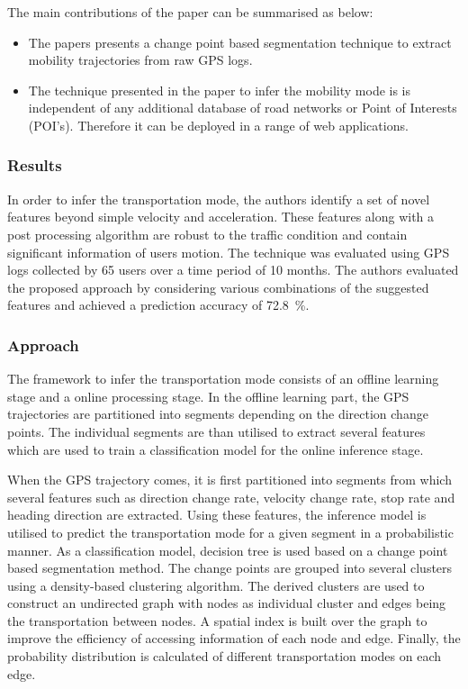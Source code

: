 The main contributions of the paper can be summarised as below:

\begin{itemize}
	\item The papers presents a change point based segmentation technique to extract mobility 
	trajectories from raw GPS logs. 
	
	\item The technique presented in the paper to infer the mobility mode is is independent 
	of any additional database of road networks or Point of Interests (POI's). Therefore it can 
	be deployed in a range of web applications. 
\end{itemize}

\subsubsection*{Results}

In order to infer the transportation mode, the authors identify a set of novel features beyond
simple velocity and acceleration. These features along with a post processing algorithm are
robust to the traffic condition and contain significant information of users motion. The technique
was evaluated using GPS logs collected by 65 users over a time period of 10 months. The authors
evaluated the proposed approach by considering various combinations of the suggested features
and achieved a prediction accuracy of 72.8~\%.

\subsubsection*{Approach}

The framework to infer the transportation mode consists of an offline learning stage and a online
processing stage. In the offline learning part, the GPS trajectories are partitioned into segments
depending on the direction change points. The individual segments are than utilised to extract
several features which are used to train a classification model for the online inference stage.\newline

When the GPS trajectory comes, it is first partitioned into segments from which several features such as
direction change rate, velocity change rate, stop rate and heading direction are extracted.
Using these features, the inference model is utilised to predict the transportation mode for
a given segment in a probabilistic manner. As a classification model, decision tree is used based on
a change point based segmentation method. The change points are grouped into several clusters using
a density-based clustering algorithm. The derived clusters are used to construct an undirected graph
with nodes as individual cluster and edges being the transportation between nodes. A spatial index is
built over the graph to improve the efficiency of accessing information of each node and edge. Finally,
the probability distribution is calculated of different transportation modes on each edge.

